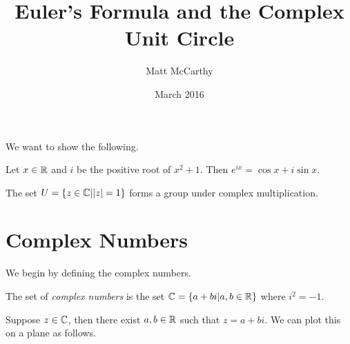 \documentclass[notitlepage]{simple}
\author{Matt McCarthy}
\title{Euler's Formula and the Complex Unit Circle}
\date{March 2016}
\begin{document}
\maketitle

We want to show the following.

\begin{thm*}
	Let $x\in\mathbb{R}$ and $i$ be the positive root of $x^2+1$.
	Then $e^{ix} = \cos x + i \sin x$.
\end{thm*}

\begin{thm*}
	The set $U = \lbrace z\in\mathbb{C} | |z|=1 \rbrace$ forms a group under complex multiplication.
\end{thm*}

\section{Complex Numbers}

We begin by defining the complex numbers.

\begin{definition}
	The set of \textit{complex numbers} is the set $\mathbb{C}=\lbrace a+bi|a,b\in\mathbb{R} \rbrace$ where $i^2=-1$.
\end{definition}

Suppose $z\in\mathbb{C}$, then there exist $a,b\in\mathbb{R}$ such that $z=a+bi$.
We can plot this on a plane as follows.
\end{document}
